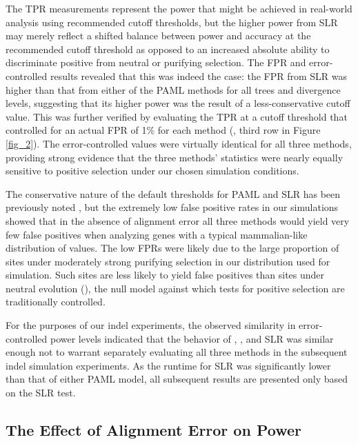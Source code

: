 The TPR measurements represent the power that might be achieved in
real-world analysis using recommended cutoff thresholds, but the
higher power from SLR may merely reflect a shifted balance between
power and accuracy at the recommended cutoff threshold as opposed to
an increased absolute ability to discriminate positive from neutral or
purifying selection. The FPR and error-controlled \tpr results
revealed that this was indeed the case: the FPR from SLR was higher
than that from either of the PAML methods for all trees and divergence
levels, suggesting that its higher power was the result of a
less-conservative cutoff value. This was further verified by
evaluating the TPR at a cutoff threshold that controlled for an actual
FPR of 1\% for each method (\tpr{}, third row in Figure
\ref{fig_2}). The error-controlled \tpr values were virtually
identical for all three methods, providing strong evidence that the
three methods' \sw statistics were nearly equally sensitive to
positive selection under our chosen simulation conditions.

The conservative nature of the default thresholds for PAML and SLR has
been previously noted
\citep{Anisimova2002Accuracy,Yang2005Bayes,Massingham2005Detecting},
but the extremely low false positive rates in our simulations showed
that in the absence of alignment error all three methods would yield
very few false positives when analyzing genes with a typical
mammalian-like distribution of \omg values. The low FPRs were likely
due to the large proportion of sites under moderately strong purifying
selection in our \omg distribution used for simulation. Such sites
are less likely to yield false positives than sites under neutral
evolution (), the null model against which tests for positive
selection are traditionally controlled.

For the purposes of our indel experiments, the observed similarity in
error-controlled power levels indicated that the behavior of \mtwo,
\meight, and SLR was similar enough not to warrant separately
evaluating all three methods in the subsequent indel simulation
experiments. As the runtime for SLR was significantly lower than that
of either PAML model, all subsequent results are presented only based
on the SLR test.

\subsection{The Effect of Alignment Error on \Sw Power}

